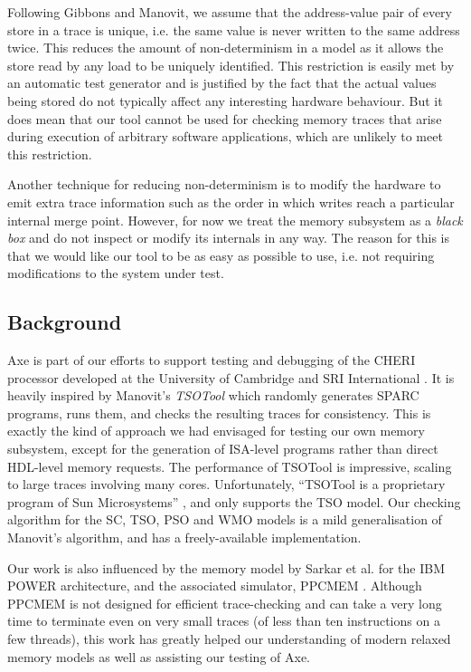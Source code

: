 \documentclass[11pt]{article}
\begin{document}
Following Gibbons \cite{Gibbons} and Manovit\cite{Manovit}, we assume
that the address-value pair of every store in a trace is unique, i.e.
the same value is never written to the same address twice.  This
reduces the amount of non-determinism in a model as it allows the
store read by any load to be uniquely identified. This restriction is
easily met by an automatic test generator and is justified by the
fact that the actual values being stored do not typically affect any
interesting hardware behaviour.  But it does mean that our tool cannot
be used for checking memory traces that arise during execution of
arbitrary software applications, which are unlikely to meet this
restriction.

Another technique for reducing non-determinism is to modify the
hardware to emit extra trace information such as the order in which
writes reach a particular internal merge point.  However, for now we
treat the memory subsystem as a \emph{black box} and do not inspect or
modify its internals in any way.  The reason for this is that we would
like our tool to be as easy as possible to use, i.e. not requiring
modifications to the system under test.


\subsection{Background}

Axe is part of our efforts to support testing and debugging of the
CHERI processor developed at the University of Cambridge and SRI
International \cite{CHERI}.  It is heavily inspired by Manovit's
\emph{TSOTool} \cite{Manovit,TSOTool} which randomly generates SPARC
programs, runs them, and checks the resulting traces for consistency.
This is exactly the kind of approach we had envisaged for testing our
own memory subsystem, except for the generation of ISA-level programs
rather than direct HDL-level memory requests.  The performance of
TSOTool is impressive, scaling to large traces involving many cores.
Unfortunately, ``TSOTool is a proprietary program of Sun Microsystems''
\cite{TSOTool}, and only supports the TSO model.  Our checking
algorithm for the SC, TSO, PSO and WMO models is a mild generalisation
of Manovit's algorithm, and has a freely-available implementation.

Our work is also influenced by the memory model by Sarkar et al.
\cite{POWER} for the IBM POWER architecture, and the associated
simulator, PPCMEM \cite{PPCMEM}.  Although PPCMEM is not designed for
efficient trace-checking and can take a very long time to terminate
even on very small traces (of less than ten instructions on a few
threads), this work has greatly helped our understanding of modern
relaxed memory models as well as assisting our testing of Axe.
\end{document}
